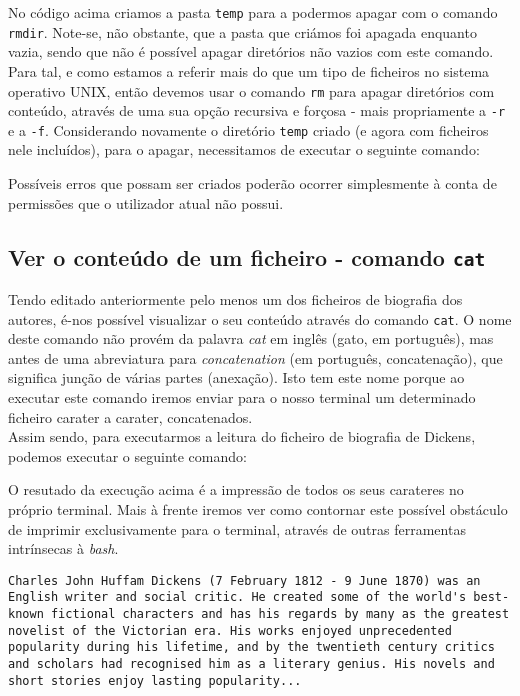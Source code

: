 \documentclass[a4paper, onecolumn, 10pt]{report}
\begin{document}


No código acima criamos a pasta \texttt{temp} para a podermos apagar com o comando \texttt{rmdir}. Note-se, não obstante, que a pasta que criámos foi apagada enquanto vazia, sendo que não é possível apagar diretórios não vazios com este comando. Para tal, e como estamos a referir mais do que um tipo de ficheiros no sistema operativo UNIX, então devemos usar o comando \texttt{rm} para apagar diretórios com conteúdo, através de uma sua opção recursiva e forçosa - mais propriamente a \texttt{-r} e a \texttt{-f}. Considerando novamente o diretório \texttt{temp} criado (e agora com ficheiros nele incluídos), para o apagar, necessitamos de executar o seguinte comando:



Possíveis erros que possam ser criados poderão ocorrer simplesmente à conta de permissões que o utilizador atual não possui.

\subsection{Ver o conteúdo de um ficheiro - comando \texttt{cat}}

Tendo editado anteriormente pelo menos um dos ficheiros de biografia dos autores, é-nos possível visualizar o seu conteúdo através do comando \texttt{cat}. O nome deste comando não provém da palavra \textit{cat} em inglês (gato, em português), mas antes de uma abreviatura para \textit{concatenation} (em português, concatenação), que significa junção de várias partes (anexação). Isto tem este nome porque ao executar este comando iremos enviar para o nosso terminal um determinado ficheiro carater a carater, concatenados. \\
Assim sendo, para executarmos a leitura do ficheiro de biografia de Dickens, podemos executar o seguinte comando:



O resutado da execução acima é a impressão de todos os seus carateres no próprio terminal. Mais à frente iremos ver como contornar este possível obstáculo de imprimir exclusivamente para o terminal, através de outras ferramentas intrínsecas à \textit{bash}. 

\begin{lstlisting}[style=console]
Charles John Huffam Dickens (7 February 1812 - 9 June 1870) was an English writer and social critic. He created some of the world's best-known fictional characters and has his regards by many as the greatest novelist of the Victorian era. His works enjoyed unprecedented popularity during his lifetime, and by the twentieth century critics and scholars had recognised him as a literary genius. His novels and short stories enjoy lasting popularity...
\end{lstlisting}
\end{document}

